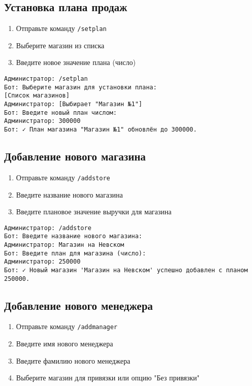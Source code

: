 \documentclass[a4paper,12pt]{article}
\begin{document}
\subsection{Установка плана продаж}
\begin{enumerate}
    \item Отправьте команду \texttt{/setplan}
    \item Выберите магазин из списка
    \item Введите новое значение плана (число)
\end{enumerate}

\begin{tcolorbox}[colback=green!5, title=Пример установки плана]
\begin{verbatim}
Администратор: /setplan
Бот: Выберите магазин для установки плана:
[Список магазинов]
Администратор: [Выбирает "Магазин №1"]
Бот: Введите новый план числом:
Администратор: 300000
Бот: ✓ План магазина "Магазин №1" обновлён до 300000.
\end{verbatim}
\end{tcolorbox}

\subsection{Добавление нового магазина}
\begin{enumerate}
    \item Отправьте команду \texttt{/addstore}
    \item Введите название нового магазина
    \item Введите плановое значение выручки для магазина
\end{enumerate}

\begin{tcolorbox}[colback=green!5, title=Пример добавления магазина]
\begin{verbatim}
Администратор: /addstore
Бот: Введите название нового магазина:
Администратор: Магазин на Невском
Бот: Введите план для магазина (число):
Администратор: 250000
Бот: ✓ Новый магазин 'Магазин на Невском' успешно добавлен с планом 250000.
\end{verbatim}
\end{tcolorbox}

\subsection{Добавление нового менеджера}
\begin{enumerate}
    \item Отправьте команду \texttt{/addmanager}
    \item Введите имя нового менеджера
    \item Введите фамилию нового менеджера
    \item Выберите магазин для привязки или опцию "Без привязки"
\end{enumerate}
\end{document}
